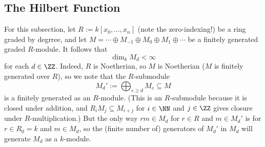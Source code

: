 \subsection{The Hilbert Function}
For this subsection, let $R:=k[x_0,\ldots,x_n]$ (note the zero-indexing!) be a ring graded by degrree, and let $M=\cdots\oplus M_{-1}\oplus M_0\oplus M_1\oplus\cdots$ be a finitely generated graded $R$-module. It follows that
\[\dim_kM_d<\infty\]
for each $d\in\ZZ$. Indeed, $R$ is Noetherian, so $M$ is Noetherian ($M$ is finitely generated over $R$), so we note that the $R$-submodule
\[M_d':=\bigoplus_{e\ge d}M_e\subseteq M\]
is a finitely generated as an $R$-module. (This is an $R$-submodule because it is closed under addition, and $R_iM_j\subseteq M_{i+j}$ for $i\in\NN$ and $j\in\ZZ$ gives closure under $R$-multiplication.) But the only way $rm\in M_d$ for $r\in R$ and $m\in M_d'$ is for $r\in R_0=k$ and $m\in M_d$, so the (finite number of) generators of $M_d'$ in $M_d$ will generate $M_d$ as a $k$-module.

